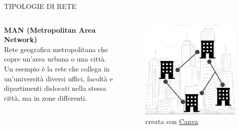 \documentclass[aspectratio=1610, handout]{beamer}
\begin{document}
\begin{frame}{TIPOLOGIE DI RETE}
    \begin{columns}
            \justifying
            \textbf{MAN (Metropolitan Area Network)} \\
            Rete geografica metropolitana che copre un'area urbana o una città. Un esempio è la rete che collega 
            in un'università diversi uffici, facoltà e dipartimenti dislocati nella stessa città, ma in zone 
            differenti.
            \begin{figure}
                \includegraphics[width=\linewidth]{img/man.png}
                \caption{{creata con \href{https://www.canva.com/}{Canva}}}
            \end{figure}
    \end{columns}
\end{frame}
\end{document}

